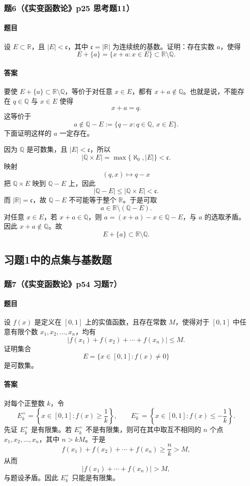 \documentclass{article}
\newcommand{\R}{\mathbb{R}}
\newcommand{\Q}{\mathbb{Q}}
\begin{document}
\subsubsection*{题6（《实变函数论》p25 思考题11）}
\paragraph{题目}设 $E\subset\R$，且 $|E|<\mathfrak c$，其中 $\mathfrak c=|\R|$ 为连续统的基数。证明：存在实数 $a$，使得
\[
E+\{a\}=\{x+a:x\in E\}\subset \R\setminus\Q .
\]

\paragraph{答案}要使 $E+\{a\}\subset \R\setminus\Q$，等价于对任意 $x\in E$，都有 $x+a\notin\Q$。也就是说，不能存在 $q\in\Q$ 与 $x\in E$ 使得
\[
x+a=q.
\]
这等价于
\[
a\notin \Q-E:=\{q-x:q\in\Q,\,x\in E\}.
\]
下面证明这样的 $a$ 一定存在。

因为 $\Q$ 是可数集，且 $|E|<\mathfrak c$，所以
\[
|\Q\times E|=\max\{\aleph_0,|E|\}<\mathfrak c.
\]
映射
\[
(q,x)\longmapsto q-x
\]
把 $\Q\times E$ 映到 $\Q-E$ 上，因此
\[
|\Q-E|\le |\Q\times E|<\mathfrak c.
\]
而 $|\R|=\mathfrak c$，故 $\Q-E$ 不可能等于整个 $\R$。于是可取
\[
a\in\R\setminus(\Q-E).
\]
对任意 $x\in E$，若 $x+a\in\Q$，则 $a=(x+a)-x\in\Q-E$，与 $a$ 的选取矛盾。因此 $x+a\notin\Q$。故
\[
E+\{a\}\subset \R\setminus\Q.
\]

\subsection{习题1中的点集与基数题}

\subsubsection*{题7（《实变函数论》p54 习题7）}
\paragraph{题目}设 $f(x)$ 是定义在 $[0,1]$ 上的实值函数，且存在常数 $M$，使得对于 $[0,1]$ 中任意有限个数 $x_1,x_2,\ldots,x_n$，均有
\[
\bigl|f(x_1)+f(x_2)+\cdots+f(x_n)\bigr|\le M.
\]
证明集合
\[
E=\{x\in[0,1]:f(x)\ne0\}
\]
是可数集。

\paragraph{答案}对每个正整数 $k$，令
\[
E_k^+=\left\{x\in[0,1]:f(x)\ge \frac1k\right\},\qquad
E_k^- =\left\{x\in[0,1]:f(x)\le -\frac1k\right\}.
\]
先证 $E_k^+$ 是有限集。若 $E_k^+$ 不是有限集，则可在其中取互不相同的 $n$ 个点 $x_1,x_2,\ldots,x_n$，其中 $n>kM$。于是
\[
f(x_1)+f(x_2)+\cdots+f(x_n)\ge \frac{n}{k}>M,
\]
从而
\[
\bigl|f(x_1)+\cdots+f(x_n)\bigr|>M,
\]
与题设矛盾。因此 $E_k^+$ 只能是有限集。
\end{document}
